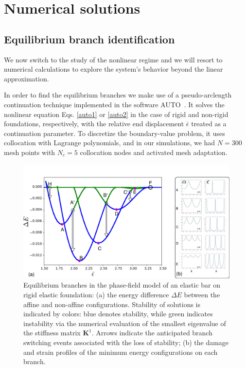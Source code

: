 
\section{Numerical solutions}
\label{sec:numerics}
\subsection{Equilibrium branch identification}

We now switch to the study of  the nonlinear regime  and we will resort to numerical calculations  to explore the system's behavior beyond the linear approximation.

In order to find the equilibrium branches we make use of a pseudo-arclength continuation technique implemented in the software AUTO~\cite{Doedel1981-sa}. It solves the nonlinear equation Eqs. \ref{auto1} or  \ref{auto2} in the case of rigid and non-rigid foundations, respectively, with the relative end displacement $\bar\epsilon$ treated as a continuation parameter. To discretize the boundary-value problem, it uses collocation with Lagrange polynomials, and in our simulations, we had $N=300$ mesh points with $N_c = 5$ collocation nodes and activated mesh adaptation. 
\begin{figure}
\includegraphics[scale=0.1]{./final_images/fig2.pdf}
    \caption{
Equilibrium branches in the phase-field model of an elastic bar on rigid elastic foundation: (a) the energy difference $\Delta E$ between the affine and non-affine configurations. Stability of solutions is indicated by colors: blue denotes stability, while green indicates instability   via the numerical evaluation of the smallest eigenvalue of the stiffness matrix $\mathbf{K}^1$. Arrows indicate the anticipated branch switching events associated with the loss of stability; (b) the damage and strain profiles of the minimum energy configurations on each branch.}
    \label{fig:enter-label}
\end{figure}
